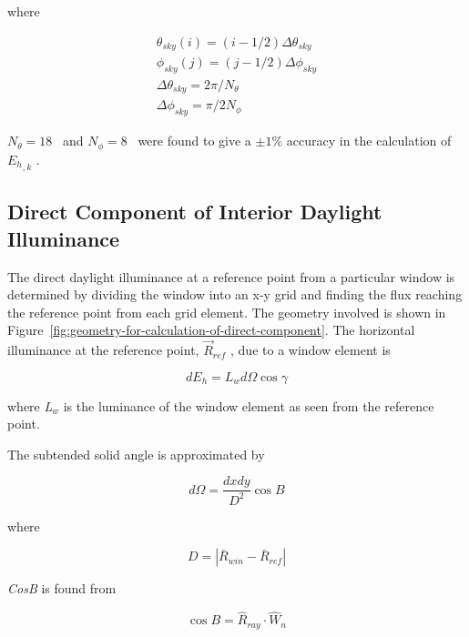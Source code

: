 where

\begin{equation}
\begin{array}{l}
    \theta_{sky}(i) = (i - 1/2) \Delta \theta_{sky} \\
    \phi_{sky}(j) = (j - 1/2) \Delta \phi_{sky} \\
    \Delta \theta_{sky} = 2 \pi / N_{\theta} \\
    \Delta \phi_{sky} = \pi / 2N_{\phi} 
\end{array}
\end{equation}

\({N_\theta } = 18\) ~and \({N_\phi } = 8\) ~were found to give a \(\pm 1\%\) accuracy in the calculation of \({E_h}_{,k}\) .

\subsection{Direct Component of Interior Daylight Illuminance}\label{direct-component-of-interior-daylight-illuminance}

The direct daylight illuminance at a reference point from a particular window is determined by dividing the window into an x-y grid and finding the flux reaching the reference point from each grid element. The geometry involved is shown in Figure~\ref{fig:geometry-for-calculation-of-direct-component}. The horizontal illuminance at the reference point, \({\vec R_{ref}}\) , due to a window element is

\begin{equation}
d{E_h} = {L_w}d\Omega \cos \gamma
\end{equation}

where \emph{L\(_{w}\)} is the luminance of the window element as seen from the reference point.

The subtended solid angle is approximated by

\begin{equation}
d\Omega  = \frac{{dxdy}}{{{D^2}}}\cos B
\end{equation}

where

\begin{equation}
D = \left| {{{\bar R}_{win}} - {{\bar R}_{ref}}} \right|
\end{equation}

\emph{CosB} is found from

\begin{equation}
\cos B = {\hat R_{ray}} \cdot {\hat W_n}
\end{equation}

